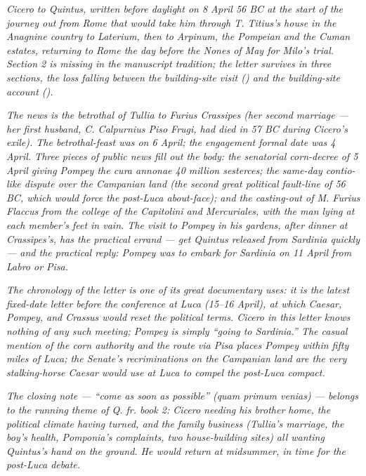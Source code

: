 
\textit{Cicero to Quintus, written before daylight on 8 April
56 BC at the start of the journey out from Rome that would
take him through T. Titius's house in the Anagnine country
to Laterium, then to Arpinum, the Pompeian and the Cuman
estates, returning to Rome the day before the Nones of May
for Milo's trial. Section 2 is missing in the manuscript
tradition; the letter survives in three sections, the loss
falling between the building-site visit () and
the building-site account ().}

\textit{The news is the betrothal of Tullia to Furius Crassipes
(her second marriage --- her first husband, C. Calpurnius
Piso Frugi, had died in 57 BC during Cicero's exile). The
betrothal-feast was on 6 April; the engagement formal date
was 4 April. Three pieces of public news fill out the body:
the senatorial corn-decree of 5 April giving Pompey the
\textit{cura annonae} 40 million sesterces; the same-day
contio-like dispute over the Campanian land (the second great
political fault-line of 56 BC, which would force the
post-Luca about-face); and the casting-out of M. Furius
Flaccus from the college of the Capitolini and Mercuriales,
with the man lying at each member's feet in vain. The visit
to Pompey in his gardens, after dinner at Crassipes's, has
the practical errand --- get Quintus released from Sardinia
quickly --- and the practical reply: Pompey was to embark for
Sardinia on 11 April from Labro or Pisa.}

\textit{The chronology of the letter is one of its great
documentary uses: it is the latest fixed-date letter before
the conference at Luca (15--16 April), at which Caesar,
Pompey, and Crassus would reset the political terms. Cicero
in this letter knows nothing of any such meeting; Pompey is
simply ``going to Sardinia.'' The casual mention of the corn
authority and the route via Pisa places Pompey within fifty
miles of Luca; the Senate's recriminations on the Campanian
land are the very stalking-horse Caesar would use at Luca to
compel the post-Luca compact.}

\textit{The closing note --- ``come as soon as possible''
(\textit{quam primum venias}) --- belongs to the running theme
of Q. fr. book 2: Cicero needing his brother home, the
political climate having turned, and the family business
(Tullia's marriage, the boy's health, Pomponia's complaints,
two house-building sites) all wanting Quintus's hand on the
ground. He would return at midsummer, in time for the
post-Luca debate.}
